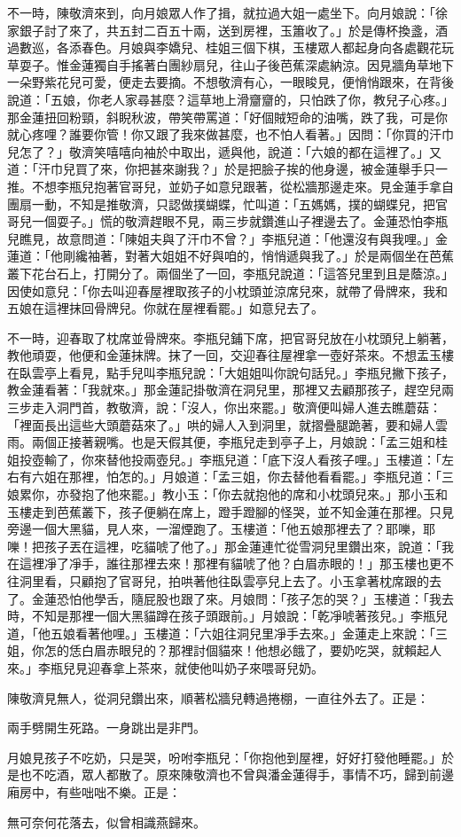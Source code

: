 不一時，陳敬濟來到，向月娘眾人作了揖，就拉過大姐一處坐下。向月娘說：「徐家銀子討了來了，共五封二百五十兩，送到房裡，玉簫收了。」於是傳杯換盞，酒過數巡，各添春色。月娘與李嬌兒、桂姐三個下棋，玉樓眾人都起身向各處觀花玩草耍子。惟金蓮獨自手搖著白團紗扇兒，往山子後芭蕉深處納涼。因見牆角草地下一朵野紫花兒可愛，便走去要摘。不想敬濟有心，一眼睃見，便悄悄跟來，在背後說道：「五娘，你老人家尋甚麼？這草地上滑齏齏的，只怕跌了你，教兒子心疼。」那金蓮扭回粉頸，斜睨秋波，帶笑帶罵道：「好個賊短命的油嘴，跌了我，可是你就心疼哩？誰要你管！你又跟了我來做甚麼，也不怕人看著。」因問：「你買的汗巾兒怎了？」敬濟笑嘻嘻向袖於中取出，遞與他，說道：「六娘的都在這裡了。」又道：「汗巾兒買了來，你把甚來謝我？」於是把臉子挨的他身邊，被金蓮舉手只一推。不想李瓶兒抱著官哥兒，並奶子如意兒跟著，從松牆那邊走來。見金蓮手拿自團扇一動，不知是推敬濟，只認做撲蝴蝶，忙叫道：「五媽媽，撲的蝴蝶兒，把官哥兒一個耍子。」慌的敬濟趕眼不見，兩三步就鑽進山子裡邊去了。金蓮恐怕李瓶兒瞧見，故意問道：「陳姐夫與了汗巾不曾？」李瓶兒道：「他還沒有與我哩。」金蓮道：「他剛纔袖著，對著大姐姐不好與咱的，悄悄遞與我了。」於是兩個坐在芭蕉叢下花台石上，打開分了。兩個坐了一回，李瓶兒說道：「這答兒里到且是蔭涼。」因使如意兒：「你去叫迎春屋裡取孩子的小枕頭並涼席兒來，就帶了骨牌來，我和五娘在這裡抹回骨牌兒。你就在屋裡看罷。」如意兒去了。

不一時，迎春取了枕席並骨牌來。李瓶兒鋪下席，把官哥兒放在小枕頭兒上躺著，教他頑耍，他便和金蓮抹牌。抹了一回，交迎春往屋裡拿一壺好茶來。不想盂玉樓在臥雲亭上看見，點手兒叫李瓶兒說：「大姐姐叫你說句話兒。」李瓶兒撇下孩子，教金蓮看著：「我就來。」那金蓮記掛敬濟在洞兒里，那裡又去顧那孩子，趕空兒兩三步走入洞門首，教敬濟，說：「沒人，你出來罷。」敬濟便叫婦人進去瞧蘑菇：「裡面長出這些大頭蘑菇來了。」哄的婦人入到洞里，就摺疊腿跪著，要和婦人雲雨。兩個正接著親嘴。也是天假其便，李瓶兒走到亭子上，月娘說：「孟三姐和桂姐投壺輸了，你來替他投兩壺兒。」李瓶兒道：「底下沒人看孩子哩。」玉樓道：「左右有六姐在那裡，怕怎的。」月娘道：「孟三姐，你去替他看看罷。」李瓶兒道：「三娘累你，亦發抱了他來罷。」教小玉：「你去就抱他的席和小枕頭兒來。」那小玉和玉樓走到芭蕉叢下，孩子便躺在席上，蹬手蹬腳的怪哭，並不知金蓮在那裡。只見旁邊一個大黑貓，見人來，一溜煙跑了。玉樓道：「他五娘那裡去了？耶嚛，耶嚛！把孩子丟在這裡，吃貓唬了他了。」那金蓮連忙從雪洞兒里鑽出來，說道：「我在這裡凈了凈手，誰往那裡去來！那裡有貓唬了他？白眉赤眼的！」那玉樓也更不往洞里看，只顧抱了官哥兒，拍哄著他往臥雲亭兒上去了。小玉拿著枕席跟的去了。金蓮恐怕他學舌，隨屁股也跟了來。月娘問：「孩子怎的哭？」玉樓道：「我去時，不知是那裡一個大黑貓蹲在孩子頭跟前。」月娘說：「乾凈唬著孩兒。」李瓶兒道，「他五娘看著他哩。」玉樓道：「六姐往洞兒里凈手去來。」金蓮走上來說：「三姐，你怎的恁白眉赤眼兒的？那裡討個貓來！他想必餓了，要奶吃哭，就賴起人來。」李瓶兒見迎春拿上茶來，就使他叫奶子來喂哥兒奶。

陳敬濟見無人，從洞兒鑽出來，順著松牆兒轉過捲棚，一直往外去了。正是：

兩手劈開生死路。一身跳出是非門。

月娘見孩子不吃奶，只是哭，吩咐李瓶兒：「你抱他到屋裡，好好打發他睡罷。」於是也不吃酒，眾人都散了。原來陳敬濟也不曾與潘金蓮得手，事情不巧，歸到前邊廂房中，有些咄咄不樂。正是：

無可奈何花落去，似曾相識燕歸來。

